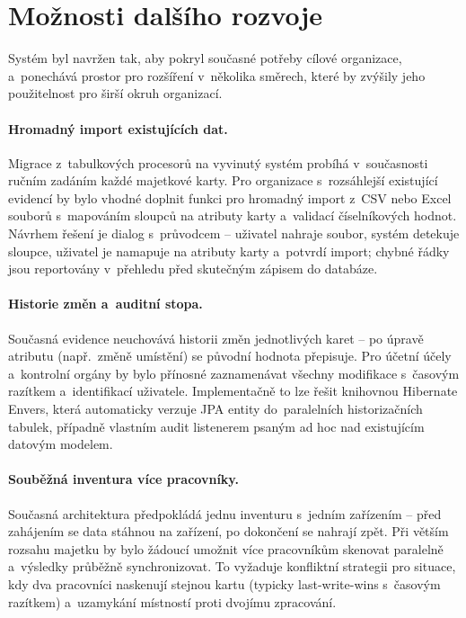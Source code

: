\section*{Možnosti dalšího rozvoje}

Systém byl navržen tak, aby pokryl současné potřeby cílové organizace, a~ponechává prostor pro rozšíření v~několika směrech, které by zvýšily jeho použitelnost pro širší okruh organizací.

\paragraph{Hromadný import existujících dat.}
Migrace z~tabulkových procesorů na vyvinutý systém probíhá v~současnosti ručním zadáním každé majetkové karty. Pro organizace s~rozsáhlejší existující evidencí by bylo vhodné doplnit funkci pro hromadný import z~CSV nebo Excel souborů s~mapováním sloupců na atributy karty a~validací číselníkových hodnot. Návrhem řešení je dialog s~průvodcem -- uživatel nahraje soubor, systém detekuje sloupce, uživatel je namapuje na atributy karty a~potvrdí import; chybné řádky jsou reportovány v~přehledu před skutečným zápisem do databáze.

\paragraph{Historie změn a~auditní stopa.}
Současná evidence neuchovává historii změn jednotlivých karet -- po úpravě atributu (např.\ změně umístění) se původní hodnota přepisuje. Pro účetní účely a~kontrolní orgány by bylo přínosné zaznamenávat všechny modifikace s~časovým razítkem a~identifikací uživatele. Implementačně to lze řešit knihovnou Hibernate Envers, která automaticky verzuje JPA entity do~paralelních historizačních tabulek, případně vlastním audit listenerem psaným ad hoc nad existujícím datovým modelem.

\paragraph{Souběžná inventura více pracovníky.}
Současná architektura předpokládá jednu inventuru s~jedním zařízením -- před zahájením se data stáhnou na zařízení, po dokončení se nahrají zpět. Při větším rozsahu majetku by bylo žádoucí umožnit více pracovníkům skenovat paralelně a~výsledky průběžně synchronizovat. To vyžaduje konfliktní strategii pro situace, kdy dva pracovníci naskenují stejnou kartu (typicky last-write-wins s~časovým razítkem) a~uzamykání místností proti dvojímu zpracování.

